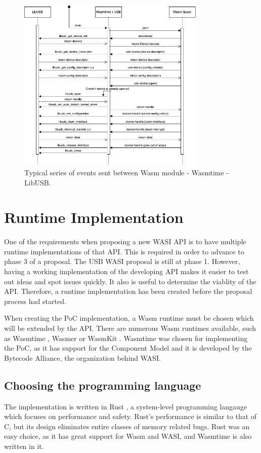 \begin{figure}[h]
  \centering
  \includegraphics[width=0.8\textwidth]{images/sequentiediagram.png}
  \caption{Typical series of events sent between Wasm module - Wasmtime - LibUSB.}
  \label{fig:implementation_overview}
\end{figure}


\section{Runtime Implementation}
One of the requirements when proposing a new \acrshort{WASI} \acrshort{API} is to have multiple runtime implementations of that \acrshort{API}. This is required in order to advance to phase 3 of a proposal. The \acrshort{USB} \acrshort{WASI} proposal is still at phase 1. However, having a working implementation of the developing \acrshort{API} makes it easier to test out ideas and spot issues quickly. It also is useful to determine the viablity of the \acrshort{API}. Therefore, a runtime implementation has been created before the proposal process had started.

When creating the \acrshort{PoC} implementation, a \acrshort{Wasm} runtime must be chosen which will be extended by the \acrshort{API}. There are numerous \acrshort{Wasm} runtimes available, such as Wasmtime \cite{wasmtime_website}, Wasmer \cite{wasmer} or WasmKit \cite{wasmkit}. Wasmtime was chosen for implementing the \acrshort{PoC}, as it has support for the Component Model and it is developed by the Bytecode Alliance, the organization behind \acrshort{WASI}.

\subsection{Choosing the programming language}
The implementation is written in Rust \cite{rust_lang}, a system-level programming langauge which focuses on performance and safety. Rust's performance is similar to that of C, but its design eliminates entire classes of memory related bugs. Rust was an easy choice, as it has great support for \acrshort{Wasm} and \acrshort{WASI}, and Wasmtime is also written in it.

